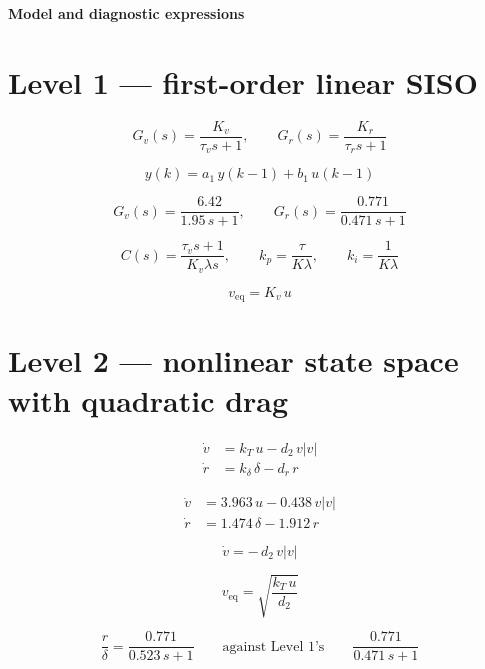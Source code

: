 \documentclass[11pt]{article}
\begin{document}
\begin{center}\Large\bfseries Model and diagnostic expressions\end{center}
\vspace{1em}

\section*{Level 1 — first-order linear SISO}

\[
G_v(s) = \frac{K_v}{\tau_v s + 1},
\qquad
G_r(s) = \frac{K_r}{\tau_r s + 1}
\]

\[
y(k) = a_1\,y(k-1) + b_1\,u(k-1)
\]

\[
G_v(s) = \frac{6.42}{1.95\,s + 1},
\qquad
G_r(s) = \frac{0.771}{0.471\,s + 1}
\]

\[
C(s) = \frac{\tau_v s + 1}{K_v \lambda s},
\qquad
k_p = \frac{\tau}{K\lambda},
\qquad
k_i = \frac{1}{K\lambda}
\]

\[
v_{\mathrm{eq}} = K_v\,u
\]

\section*{Level 2 — nonlinear state space with quadratic drag}

\begin{align*}
\dot v &= k_T\,u - d_2\,v|v| \\
\dot r &= k_\delta\,\delta - d_r\,r
\end{align*}

\begin{align*}
\dot v &= 3.963\,u - 0.438\,v|v| \\
\dot r &= 1.474\,\delta - 1.912\,r
\end{align*}

\[
\dot v = -\,d_2\,v|v|
\]

\[
v_{\mathrm{eq}} = \sqrt{\frac{k_T\,u}{d_2}}
\]

\[
\frac{r}{\delta} = \frac{0.771}{0.523\,s + 1}
\qquad\text{against Level 1's}\qquad
\frac{0.771}{0.471\,s + 1}
\]
\end{document}

